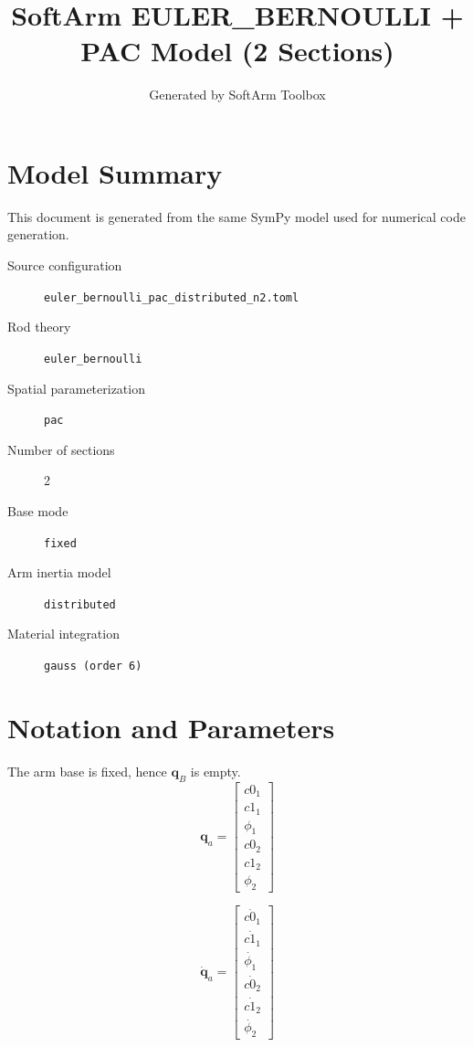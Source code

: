 \documentclass[11pt]{article}
\title{SoftArm EULER\_BERNOULLI + PAC Model (2 Sections)}
\author{Generated by SoftArm Toolbox}
\date{}
\begin{document}
\maketitle

\section{Model Summary}
This document is generated from the same SymPy model used for numerical code generation.
\begin{description}
\item[Source configuration] \texttt{euler\_bernoulli\_pac\_distributed\_n2.toml}
\item[Rod theory] \texttt{euler\_bernoulli}
\item[Spatial parameterization] \texttt{pac}
\item[Number of sections] 2
\item[Base mode] \texttt{fixed}
\item[Arm inertia model] \texttt{distributed}
\item[Material integration] \texttt{gauss (order 6)}
\end{description}

\section{Notation and Parameters}
The arm base is fixed, hence $\boldsymbol q_B$ is empty.
\begin{equation}
\boldsymbol q_a=\begin{bmatrix}c0_{1}\\c1_{1}\\\phi_{1}\\c0_{2}\\c1_{2}\\\phi_{2}\end{bmatrix}
\end{equation}

\begin{equation}
\dot{\boldsymbol q}_a=\begin{bmatrix}\dot{c0_{1}}\\\dot{c1_{1}}\\\dot{\phi_{1}}\\\dot{c0_{2}}\\\dot{c1_{2}}\\\dot{\phi_{2}}\end{bmatrix}
\end{equation}
\end{document}
